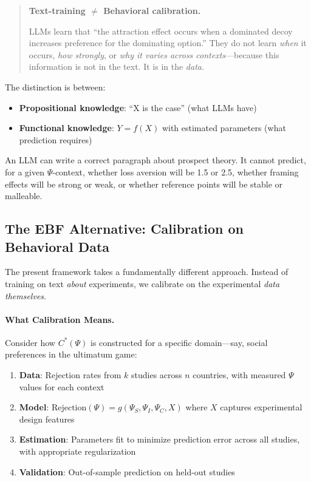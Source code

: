 \begin{quote}
\textbf{Text-training $\neq$ Behavioral calibration.}

LLMs learn that ``the attraction effect occurs when a dominated decoy
increases preference for the dominating option.'' They do not learn
\emph{when} it occurs, \emph{how strongly}, or \emph{why it varies across
contexts}---because this information is not in the text. It is in the
\emph{data}.
\end{quote}

The distinction is between:
\begin{itemize}
    \item \textbf{Propositional knowledge}: ``X is the case'' (what LLMs have)
    \item \textbf{Functional knowledge}: $Y = f(X)$ with estimated parameters
          (what prediction requires)
\end{itemize}

An LLM can write a correct paragraph about prospect theory. It cannot
predict, for a given $\Psi$-context, whether loss aversion will be 1.5 or
2.5, whether framing effects will be strong or weak, or whether reference
points will be stable or malleable.


\subsection{The EBF Alternative: Calibration on Behavioral Data}
\label{sec:ch4x-ebf-alternative}

The present framework takes a fundamentally different approach. Instead of
training on text \emph{about} experiments, we calibrate on the experimental
\emph{data themselves}.

\paragraph{What Calibration Means.}
Consider how $C^*(\Psi)$ is constructed for a specific domain---say, social
preferences in the ultimatum game:

\begin{enumerate}
    \item \textbf{Data}: Rejection rates from $k$ studies across $n$ countries,
          with measured $\Psi$ values for each context
    \item \textbf{Model}: $\text{Rejection}(\Psi) = g(\Psi_S, \Psi_I, \Psi_C, X)$
          where $X$ captures experimental design features
    \item \textbf{Estimation}: Parameters fit to minimize prediction error
          across all studies, with appropriate regularization
    \item \textbf{Validation}: Out-of-sample prediction on held-out studies
\end{enumerate}

